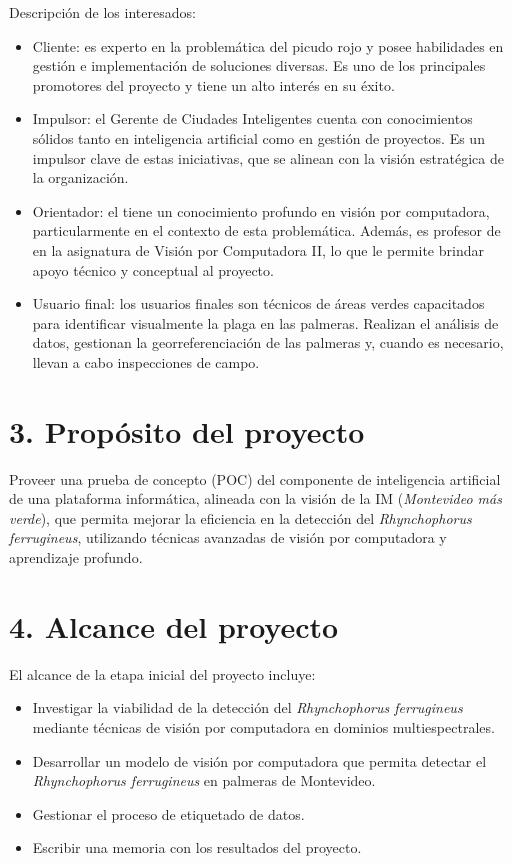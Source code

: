 \documentclass[
11pt, %
]{charter}
\begin{document}
Descripción de los interesados:
\begin{itemize}
  \item Cliente: es experto en la problemática del picudo rojo y posee habilidades en gestión e implementación de soluciones diversas. Es uno de los principales promotores del proyecto y tiene un alto interés en su éxito.

  \item Impulsor: el Gerente de Ciudades Inteligentes cuenta con conocimientos sólidos tanto en inteligencia artificial como en gestión de proyectos. Es un impulsor clave de estas iniciativas, que se alinean con la visión estratégica de la organización.

  \item Orientador: el {\supname} tiene un conocimiento profundo en visión por computadora, particularmente en el contexto de esta problemática. Además, es profesor de {\pertesupname} en la asignatura de Visión por Computadora II, lo que le permite brindar apoyo técnico y conceptual al proyecto.

  \item Usuario final: los usuarios finales son técnicos de áreas verdes capacitados para identificar visualmente la plaga en las palmeras. Realizan el análisis de datos, gestionan la georreferenciación de las palmeras y, cuando es necesario, llevan a cabo inspecciones de campo.
\end{itemize}

\section{3. Propósito del proyecto}
\label{sec:proposito}

Proveer una prueba de concepto (POC) del componente de inteligencia artificial de una plataforma informática, alineada con la visión de la IM (\textit{Montevideo más verde}), que permita mejorar la eficiencia en la detección del \textit{Rhynchophorus ferrugineus}, utilizando técnicas avanzadas de visión por computadora y aprendizaje profundo.

\section{4. Alcance del proyecto}
\label{sec:alcance}

El alcance de la etapa inicial del proyecto incluye:
\begin{itemize}
  \item Investigar la viabilidad de la detección del \textit{Rhynchophorus ferrugineus} mediante técnicas de visión por computadora en dominios multiespectrales.
  \item Desarrollar un modelo de visión por computadora que permita detectar el \textit{Rhynchophorus ferrugineus} en palmeras de Montevideo.
  \item Gestionar el proceso de etiquetado de datos.
  \item Escribir una memoria con los resultados del proyecto.
\end{itemize}
\end{document}
